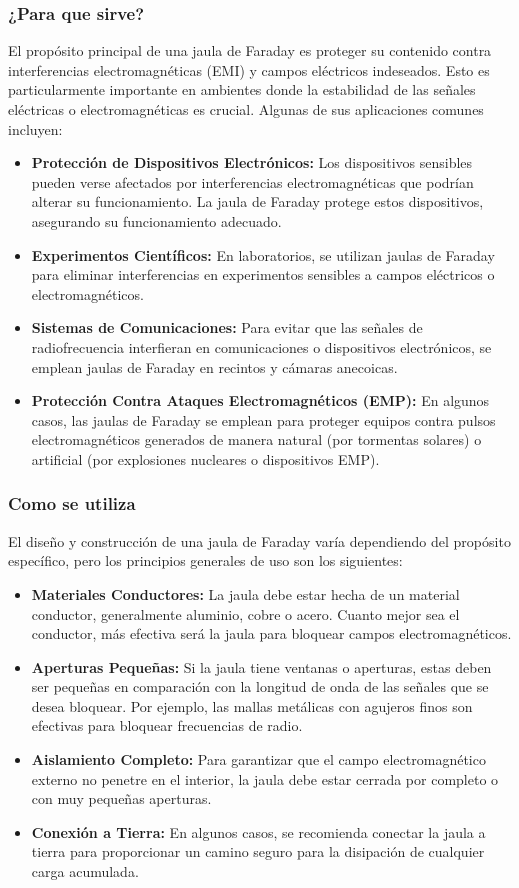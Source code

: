 \documentclass{article}
\begin{document}
\subsubsection{¿Para que sirve?}
El propósito principal de una jaula de Faraday es proteger su contenido contra interferencias electromagnéticas (EMI) y campos eléctricos indeseados. Esto es particularmente importante en ambientes donde la estabilidad de las señales eléctricas o electromagnéticas es crucial. Algunas de sus aplicaciones comunes incluyen:
\begin{itemize}
    \item \textbf{Protección de Dispositivos Electrónicos:} Los dispositivos sensibles pueden verse afectados por interferencias electromagnéticas que podrían alterar su funcionamiento. La jaula de Faraday protege estos dispositivos, asegurando su funcionamiento adecuado.
    \item \textbf{Experimentos Científicos:} En laboratorios, se utilizan jaulas de Faraday para eliminar interferencias en experimentos sensibles a campos eléctricos o electromagnéticos.
    \item \textbf{Sistemas de Comunicaciones:} Para evitar que las señales de radiofrecuencia interfieran en comunicaciones o dispositivos electrónicos, se emplean jaulas de Faraday en recintos y cámaras anecoicas.
    \item \textbf{Protección Contra Ataques Electromagnéticos (EMP):} En algunos casos, las jaulas de Faraday se emplean para proteger equipos contra pulsos electromagnéticos generados de manera natural (por tormentas solares) o artificial (por explosiones nucleares o dispositivos EMP).
\end{itemize}

\subsubsection{Como se utiliza}
El diseño y construcción de una jaula de Faraday varía dependiendo del propósito específico, pero los principios generales de uso son los siguientes:
\begin{itemize}
    \item \textbf{Materiales Conductores:} La jaula debe estar hecha de un material conductor, generalmente aluminio, cobre o acero. Cuanto mejor sea el conductor, más efectiva será la jaula para bloquear campos electromagnéticos.
    \item \textbf{Aperturas Pequeñas:} Si la jaula tiene ventanas o aperturas, estas deben ser pequeñas en comparación con la longitud de onda de las señales que se desea bloquear. Por ejemplo, las mallas metálicas con agujeros finos son efectivas para bloquear frecuencias de radio.
    \item \textbf{Aislamiento Completo:} Para garantizar que el campo electromagnético externo no penetre en el interior, la jaula debe estar cerrada por completo o con muy pequeñas aperturas.
    \item \textbf{Conexión a Tierra:} En algunos casos, se recomienda conectar la jaula a tierra para proporcionar un camino seguro para la disipación de cualquier carga acumulada.
\end{itemize}
\end{document}
